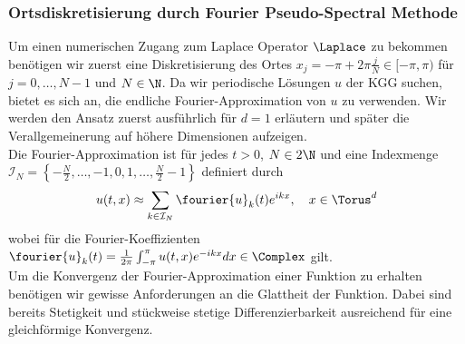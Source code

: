 \subsubsection*{Ortsdiskretisierung durch Fourier Pseudo-Spectral Methode}
Um einen numerischen Zugang zum Laplace Operator $\Laplace$ zu bekommen benötigen wir zuerst eine Diskretisierung des Ortes $x_j=-\pi+2\pi\frac{j}{N}\in [-\pi,\pi)$ für $j=0,\dots,N-1$ und $N\in\N$. Da wir periodische Lösungen $u$ der KGG suchen, bietet es sich an, die endliche Fourier-Approximation von $u$ zu verwenden. Wir werden den Ansatz zuerst ausführlich für $d=1$ erläutern und später die Verallgemeinerung auf höhere Dimensionen aufzeigen.\\
Die Fourier-Approximation ist für jedes $t>0$, $N\in 2\N$ und eine Indexmenge $\mathcal{I}_N=\left\lbrace -\frac{N}{2},\dots,-1,0,1,\dots,\frac{N}{2}-1\right\rbrace$ definiert durch
\begin{equation}
\label{eqn:fourier_approx}
u(t,x)\approx \sum_{k\in\mathcal{I}_N}\fourier{u}_k(t)e^{ikx}, \quad x\in\Torus^d
\end{equation}
wobei für die Fourier-Koeffizienten $\fourier{u}_k(t)=\frac{1}{2\pi}\int_{-\pi}^\pi u(t,x)e^{-ikx}dx\in\Complex$ gilt. \\
Um die Konvergenz der Fourier-Approximation einer Funktion zu erhalten benötigen wir gewisse Anforderungen an die Glattheit der Funktion. Dabei sind bereits Stetigkeit und stückweise stetige Differenzierbarkeit ausreichend für eine gleichförmige Konvergenz. 
